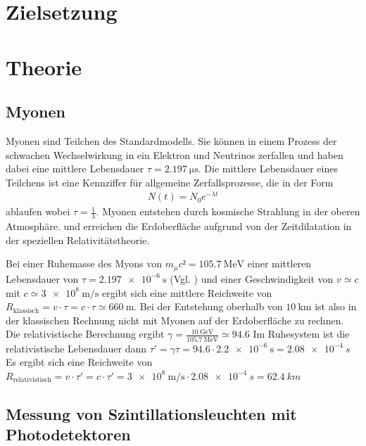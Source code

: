 \section{Zielsetzung}


\section{Theorie}
\subsection{Myonen}
Myonen sind Teilchen des Standardmodells.
Sie können in einem Prozess der schwachen Wechselwirkung in ein
Elektron und Neutrinos zerfallen und haben dabei eine mittlere Lebensdauer
$\tau = \qty{2.197}{\micro\s}$\cite{Workman:2022ynf}.
Die mittlere Lebensdauer eines Teilchens ist eine Kennziffer für
allgemeine Zerfallsprozesse, die in der Form
\begin{align}
	N(t) = N_0 e^{-\lambda t}
\end{align}
ablaufen wobei $\tau = \frac{1}{\lambda}$.
Myonen entstehen durch kosmische Strahlung in der oberen Atmosphäre.
und erreichen die Erdoberfläche aufgrund von der Zeitdilatation in
der speziellen Relativitätstheorie.%

Bei einer Ruhemasse des Myons von $m_\mu c² = \qty{105.7}{\MeV}$
einer mittleren Lebensdauer von $\tau = \qty{2.197e-6}{\s}$ (Vgl. \cite{Workman:2022ynf})
und einer Geschwindigkeit von $v \simeq c$ mit $c \simeq \qty{3e8}{\meter\per\second}$ ergibt sich eine mittlere
Reichweite von $R_\text{klassisch} = v\cdot\tau = c\cdot \tau \simeq \qty{660}{\m}$. 
Bei der Entstehung oberhalb von $\qty{10}{\km}$ ist also in der klassischen Rechnung  nicht mit Myonen auf der Erdoberfläche
zu rechnen.
Die relativistische Berechnung ergibt $\gamma = \frac{\qty{10}{\GeV}}{\qty{105.7}{\MeV}} \simeq \num{94.6}$
Im Ruhesystem ist die relativistische Lebensdauer dann $\tau' = \gamma \tau = 94.6 \cdot \qty{2.2e-6}{\s}=\qty{2.08e-4}{s} $
Es ergibt sich eine Reichweite von $R_\text{relativistisch}= v⋅τ'=c⋅τ'=\qty{3e8}{\meter\per\second} \cdot \qty{2.08e-4}{s}=\qty{62.4}{km}$


\subsection{Messung von Szintillationsleuchten mit Photodetektoren \cite{book:kolano}}

